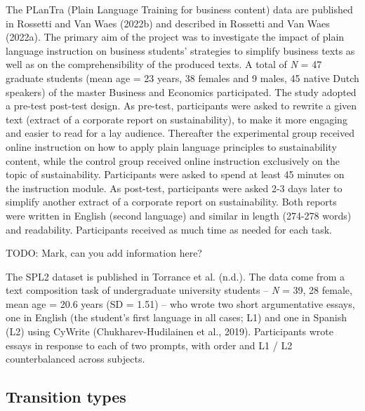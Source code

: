 \documentclass[
  english,
  man,floatsintext]{apa7}
\begin{document}
The PLanTra (Plain Language Training for business content) data are published in Rossetti and Van Waes (2022b) and described in Rossetti and Van Waes (2022a). The primary aim of the project was to investigate the impact of plain language instruction on business students' strategies to simplify business texts as well as on the comprehensibility of the produced texts. A total of \emph{N} = 47 graduate students (mean age = 23 years, 38 females and 9 males, 45 native Dutch speakers) of the master Business and Economics participated. The study adopted a pre-test post-test design. As pre-test, participants were asked to rewrite a given text (extract of a corporate report on sustainability), to make it more engaging and easier to read for a lay audience. Thereafter the experimental group received online instruction on how to apply plain language principles to sustainability content, while the control group received online instruction exclusively on the topic of sustainability. Participants were asked to spend at least 45 minutes on the instruction module. As post-test, participants were asked 2-3 days later to simplify another extract of a corporate report on sustainability. Both reports were written in English (second language) and similar in length (274-278 words) and readability. Participants received as much time as needed for each task.

TODO: Mark, can you add information here?

The SPL2 dataset is published in Torrance et al. (n.d.). The data come from a text composition task of undergraduate university students -- \emph{N} = 39, 28 female, mean age = 20.6 years (SD = 1.51) -- who wrote two short argumentative essays, one in English (the student's first language in all cases; L1) and one in Spanish (L2) using CyWrite (Chukharev-Hudilainen et al., 2019). Participants wrote essays in response to each of two prompts, with order and L1 / L2 counterbalanced across subjects.

\hypertarget{transition-types}{%
\subsection{Transition types}\label{transition-types}}
\end{document}
